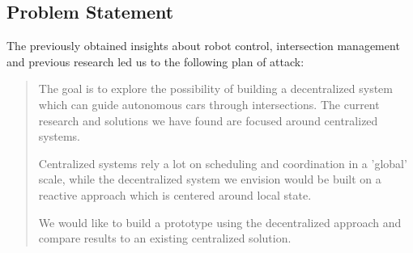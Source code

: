 
\subsection{Problem Statement}
The previously obtained insights about robot control, intersection management and previous research led us to the following plan of attack:

\begin{quotation}
The goal is to explore the possibility of building a decentralized system which can guide autonomous cars through intersections. 
The current research and solutions we have found are focused around centralized systems. 

Centralized systems rely a lot on scheduling and coordination in a 'global' scale, 
while the decentralized system we envision would be built on a reactive approach which is centered around local state. 

We would like to build a prototype using the decentralized approach and compare results to an existing centralized solution.
\end{quotation}